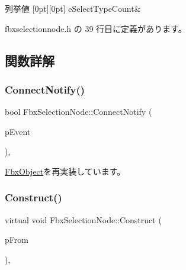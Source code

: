 \begin{DoxyEnumFields}{列挙値}
[0pt][0pt]{}\mbox{\label{class_fbx_selection_node_aa24cf47b60ff436a1cce9409da37e78fa6f7e60aadbb76284e3352814a5a4f299}} 
e\+Select\+Type\+Count&\\
\hline

\end{DoxyEnumFields}


 fbxselectionnode.\+h の 39 行目に定義があります。



\subsection{関数詳解}
\mbox{\label{class_fbx_selection_node_acf8e30df7df84c4fbff9c12f64a2b3fe}} 
\subsubsection{\texorpdfstring{Connect\+Notify()}{ConnectNotify()}}
{\footnotesize\ttfamily bool Fbx\+Selection\+Node\+::\+Connect\+Notify (\begin{DoxyParamCaption}\item[{\hyperlink{class_fbx_connect_event}{Fbx\+Connect\+Event} const \&}]{p\+Event }\end{DoxyParamCaption})\hspace{0.3cm}{\ttfamily [protected]}, {\ttfamily [virtual]}}



\hyperlink{class_fbx_object_ab7a400f3829d1f0da57d3d78c8168dd0}{Fbx\+Object}を再実装しています。

\mbox{\label{class_fbx_selection_node_aaef80cf95a8109fe5cc6263f18d7cb99}} 
\subsubsection{\texorpdfstring{Construct()}{Construct()}}
{\footnotesize\ttfamily virtual void Fbx\+Selection\+Node\+::\+Construct (\begin{DoxyParamCaption}\item[{const \hyperlink{class_fbx_object}{Fbx\+Object} $\ast$}]{p\+From }\end{DoxyParamCaption})\hspace{0.3cm}{\ttfamily [protected]}, {\ttfamily [virtual]}}

